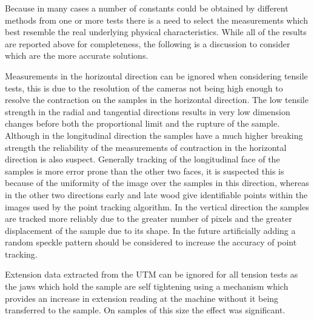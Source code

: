 \documentclass[10pt]{article}
\begin{document}
Because in many cases a number of constants could be obtained by different methods from one or more tests there is a need to select the measurements which best resemble the real underlying physical characteristics. While all of the results are reported above for completeness, the following is a discussion to consider which are the more accurate solutions.

Measurements in the horizontal direction can be ignored when considering tensile tests, this is due to the resolution of the cameras not being high enough to resolve the contraction on the samples in the horizontal direction. The low tensile strength in the radial and tangential directions results in very low dimension changes before both the proportional limit and the rupture of the sample. Although in the longitudinal direction the samples have a much higher breaking strength the reliability of the measurements of contraction in the horizontal direction is also suspect. Generally tracking of the longitudinal face of the samples is more error prone than the other two faces, it is suspected this is because of the uniformity of the image over the samples in this direction, whereas in the other two directions early and late wood give identifiable points within the images used by the point tracking algorithm. In the vertical direction the samples are tracked more reliably due to the greater number of pixels and the greater displacement of the sample due to its shape. In the future artificially adding a random speckle pattern should be considered to increase the accuracy of point tracking.

Extension data extracted from the UTM can be ignored for all tension tests as the jaws which hold the sample are self tightening using a mechanism which provides an increase in extension reading at the machine without it being transferred to the sample. On samples of this size the effect was significant.
\end{document}
